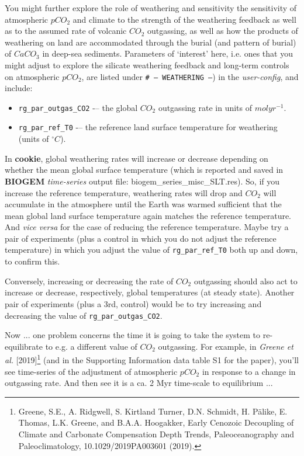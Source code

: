 You might further explore the role of weathering and sensitivity the sensitivity of atmospheric \(pCO_{2}\) and climate to the strength  of the weathering feedback as well as to the assumed rate of volcanic \(CO_{2}\) outgassing, as well as how the products of weathering on land are accommodated through the burial (and pattern of burial) of \(CaCO_{3}\) in deep-sea sediments.
Parameters of ‘interest’ here, i.e. ones that you might adjust to explore the silicate weathering feedback and long-term controls on atmospheric \(pCO_{2}\), are listed under \texttt{\# --- WEATHERING ---}) in the \textit{user-config}, and include:
\vspace{1mm}
\begin{itemize}[noitemsep]
\item \texttt{rg\_par\_outgas\_CO2} -– the global \(CO_{2}\) outgassing rate in units of \(mol yr^{-1}\).
\item \texttt{rg\_par\_ref\_T0} -– the reference land surface temperature for weathering (units of \(^{\circ} C\)).
\end{itemize}
\vspace{1mm}

In \textbf{cookie}, global weathering rates will increase or decrease depending on whether the mean global surface temperature (which is reported and saved in \textbf{BIOGEM} \textit{time-series} output file: \textsf{\footnotesize biogem\_series\_misc\_SLT.res}). So, if you increase the reference temperature, weathering rates will drop and \(CO_{2}\) will accumulate in the atmosphere until the Earth was warmed sufficient that the mean global land surface temperature again matches the reference temperature. And \textit{vice versa} for the case of reducing the reference temperature. Maybe try a pair of experiments (plus a control in which you do not adjust the reference temperature) in which you adjust the value of \texttt{rg\_par\_ref\_T0} both up and down, to confirm this.

Conversely, increasing or decreasing the rate of \(CO_{2}\) outgassing should also act to increase or decrease, respectively, global temperatures (at steady state). Another pair of experiments (plus a 3rd, control) would be to try increasing and decreasing the value of \texttt{rg\_par\_outgas\_CO2}.

Now ... one problem concerns the time it is going to take the system to re-equilibrate to e.g. a different value of \(CO_{2}\) outgassing. For example, in \textit{Greene et al.} [2019]\footnote{ Greene, S.E., A. Ridgwell, S. Kirtland Turner, D.N. Schmidt, H. Pälike, E. Thomas, L.K. Greene, and B.A.A. Hoogakker, Early Cenozoic Decoupling of Climate and Carbonate Compensation Depth Trends, Paleoceanography and Paleoclimatology, 10.1029/2019PA003601 (2019).} (and in the Supporting Information data table S1 for the paper), you'll see time-series of the adjustment of atmospheric \(pCO_{2}\) in response to a change in outgassing rate. And then see it is a ca. 2 Myr time-scale to equilibrium ...

